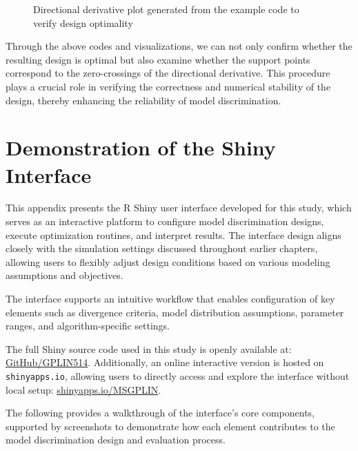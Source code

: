 \begin{figure}[H]
    \caption{Directional derivative plot generated from the example code to verify design optimality}
\end{figure}

\hspace*{8mm} Through the above codes and visualizations, we can not only confirm whether the resulting design is optimal but also examine whether the support points correspond to the zero-crossings of the directional derivative. This procedure plays a crucial role in verifying the correctness and numerical stability of the design, thereby enhancing the reliability of model discrimination.

\chapter{Demonstration of the Shiny Interface}\label{appendixC}

\hspace*{8mm} This appendix presents the R Shiny user interface developed for this study, which serves as an interactive platform to configure model discrimination designs, execute optimization routines, and interpret results. The interface design aligns closely with the simulation settings discussed throughout earlier chapters, allowing users to flexibly adjust design conditions based on various modeling assumptions and objectives.

\hspace*{8mm} The interface supports an intuitive workflow that enables configuration of key elements such as divergence criteria, model distribution assumptions, parameter ranges, and algorithm-specific settings. 

\hspace*{8mm} The full Shiny source code used in this study is openly available at: \href{https://github.com/GPLIN514/Master-Thesis-ALT-Model-Discrimination-Design/tree/main/Thesis-code/shiny-demo}{GitHub/GPLIN514}. Additionally, an online interactive version is hosted on \verb|shinyapps.io|, allowing users to directly access and explore the interface without local setup: \href{https://msgplin.shinyapps.io/Model-Discrimination-Design/}{shinyapps.io/MSGPLIN}.

\hspace*{8mm} The following provides a walkthrough of the interface's core components, supported by screenshots to demonstrate how each element contributes to the model discrimination design and evaluation process.

